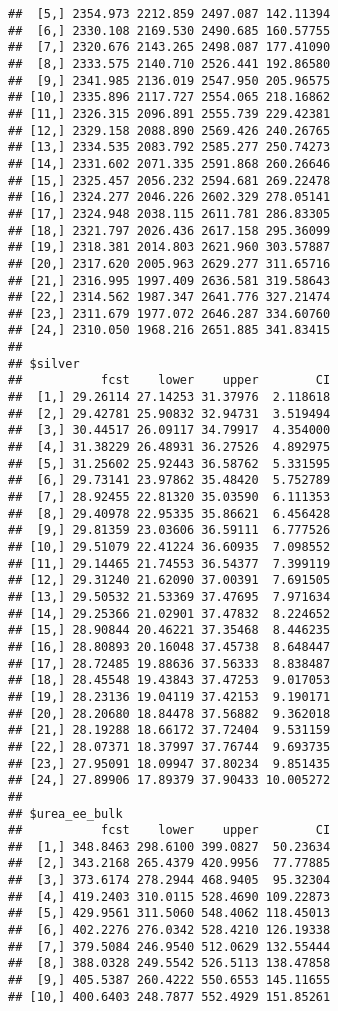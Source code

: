 \documentclass[
]{article}
\begin{document}
\begin{verbatim}
##  [5,] 2354.973 2212.859 2497.087 142.11394
##  [6,] 2330.108 2169.530 2490.685 160.57755
##  [7,] 2320.676 2143.265 2498.087 177.41090
##  [8,] 2333.575 2140.710 2526.441 192.86580
##  [9,] 2341.985 2136.019 2547.950 205.96575
## [10,] 2335.896 2117.727 2554.065 218.16862
## [11,] 2326.315 2096.891 2555.739 229.42381
## [12,] 2329.158 2088.890 2569.426 240.26765
## [13,] 2334.535 2083.792 2585.277 250.74273
## [14,] 2331.602 2071.335 2591.868 260.26646
## [15,] 2325.457 2056.232 2594.681 269.22478
## [16,] 2324.277 2046.226 2602.329 278.05141
## [17,] 2324.948 2038.115 2611.781 286.83305
## [18,] 2321.797 2026.436 2617.158 295.36099
## [19,] 2318.381 2014.803 2621.960 303.57887
## [20,] 2317.620 2005.963 2629.277 311.65716
## [21,] 2316.995 1997.409 2636.581 319.58643
## [22,] 2314.562 1987.347 2641.776 327.21474
## [23,] 2311.679 1977.072 2646.287 334.60760
## [24,] 2310.050 1968.216 2651.885 341.83415
## 
## $silver
##           fcst    lower    upper        CI
##  [1,] 29.26114 27.14253 31.37976  2.118618
##  [2,] 29.42781 25.90832 32.94731  3.519494
##  [3,] 30.44517 26.09117 34.79917  4.354000
##  [4,] 31.38229 26.48931 36.27526  4.892975
##  [5,] 31.25602 25.92443 36.58762  5.331595
##  [6,] 29.73141 23.97862 35.48420  5.752789
##  [7,] 28.92455 22.81320 35.03590  6.111353
##  [8,] 29.40978 22.95335 35.86621  6.456428
##  [9,] 29.81359 23.03606 36.59111  6.777526
## [10,] 29.51079 22.41224 36.60935  7.098552
## [11,] 29.14465 21.74553 36.54377  7.399119
## [12,] 29.31240 21.62090 37.00391  7.691505
## [13,] 29.50532 21.53369 37.47695  7.971634
## [14,] 29.25366 21.02901 37.47832  8.224652
## [15,] 28.90844 20.46221 37.35468  8.446235
## [16,] 28.80893 20.16048 37.45738  8.648447
## [17,] 28.72485 19.88636 37.56333  8.838487
## [18,] 28.45548 19.43843 37.47253  9.017053
## [19,] 28.23136 19.04119 37.42153  9.190171
## [20,] 28.20680 18.84478 37.56882  9.362018
## [21,] 28.19288 18.66172 37.72404  9.531159
## [22,] 28.07371 18.37997 37.76744  9.693735
## [23,] 27.95091 18.09947 37.80234  9.851435
## [24,] 27.89906 17.89379 37.90433 10.005272
## 
## $urea_ee_bulk
##           fcst    lower    upper        CI
##  [1,] 348.8463 298.6100 399.0827  50.23634
##  [2,] 343.2168 265.4379 420.9956  77.77885
##  [3,] 373.6174 278.2944 468.9405  95.32304
##  [4,] 419.2403 310.0115 528.4690 109.22873
##  [5,] 429.9561 311.5060 548.4062 118.45013
##  [6,] 402.2276 276.0342 528.4210 126.19338
##  [7,] 379.5084 246.9540 512.0629 132.55444
##  [8,] 388.0328 249.5542 526.5113 138.47858
##  [9,] 405.5387 260.4222 550.6553 145.11655
## [10,] 400.6403 248.7877 552.4929 151.85261

\end{verbatim}
\end{document}
